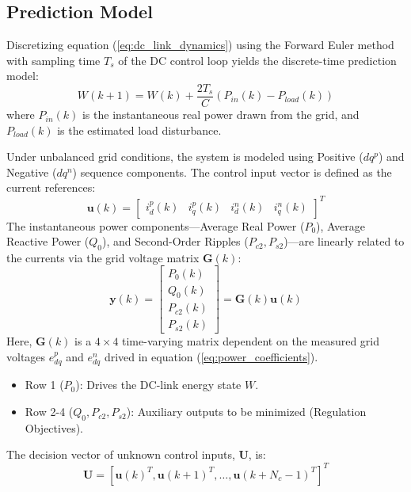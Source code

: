 \subsection{Prediction Model}
Discretizing equation (\ref{eq:dc_link_dynamics}) using the Forward Euler method with sampling time $T_s$ of the DC control
loop yields the discrete-time prediction model:
\begin{equation}
    W(k+1) = W(k) + \frac{2 T_s}{C} \left( P_{in}(k) - P_{load}(k) \right)
    \label{eq:dc_link_discrete_model}
\end{equation}
where $P_{in}(k)$ is the instantaneous real power drawn from the grid, and $P_{load}(k)$ is the estimated load disturbance.\par
Under unbalanced grid conditions, the system is modeled using Positive ($dq^p$) and Negative ($dq^n$) sequence components.
The control input vector is defined as the current references:
\begin{equation}
    \mathbf{u}(k) = \begin{bmatrix} i_d^p(k) & i_q^p(k) & i_d^n(k) & i_q^n(k) \end{bmatrix}^T
    \label{eq:control_input_vector}
\end{equation}
The instantaneous power components—Average Real Power ($P_0$), Average Reactive Power ($Q_0$), and Second-Order Ripples
($P_{c2}, P_{s2}$)—are linearly related to the currents via the grid voltage matrix $\mathbf{G}(k)$:
\begin{equation}
    \mathbf{y}(k) = \begin{bmatrix} P_0(k) \\ Q_0(k) \\ P_{c2}(k) \\ P_{s2}(k) \end{bmatrix} = \mathbf{G}(k) \mathbf{u}(k)
    \label{eq:Auxiliary_term_sample}
\end{equation}
Here, $\mathbf{G}(k)$ is a $4 \times 4$ time-varying matrix dependent on the measured grid voltages $e_{dq}^p$ and $e_{dq}^n$ drived in
equation (\ref{eq:power_coefficients}).
\begin{itemize}
    \item Row 1 ($P_0$): Drives the DC-link energy state $W$.
    \item Row 2-4 ($Q_0, P_{c2}, P_{s2}$): Auxiliary outputs to be minimized (Regulation Objectives).
\end{itemize}
The decision vector of unknown control inputs, $\mathbf{U}$, is:
\begin{equation}
    \mathbf{U} = [\mathbf{u}(k)^T, \mathbf{u}(k+1)^T, \dots, \mathbf{u}(k+N_c-1)^T]^T
    \label{eq:decision_vector}
\end{equation}
